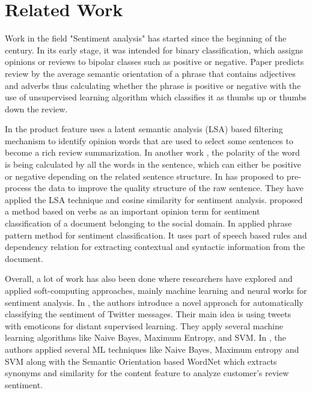 
\section{Related Work}
\label{sec: backg}

Work in the field "Sentiment analysis" has started since the beginning of the century. In its early stage, it was intended for binary classification, which assigns opinions or reviews to bipolar classes such as positive or negative. Paper \cite{turney2002thumbs} predicts review by the average semantic orientation of a phrase that contains adjectives and adverbs thus calculating whether the phrase is positive or negative with the use of unsupervised learning algorithm which classifies it as thumbs up or thumbs down the review. 
 
 In \cite{liu2011movie} the product feature uses a latent semantic analysis (LSA) based filtering mechanism to identify opinion words that are used to select some sentences to become a rich review summarization.  In another work \cite{khan2011sentiment}, the polarity of the word is being calculated by all the words in the sentence, which can either be positive or negative depending on the related sentence structure. In \cite{ramachandran2011automated} has proposed to pre-process the data to improve the quality structure of the raw sentence. They have applied the LSA technique and cosine similarity for sentiment analysis. \cite{karamibekr2012verb} proposed a method based on verbs as an important opinion term for sentiment classification of a document belonging to the social domain. In \cite{agarwal2013sentiment} applied phrase pattern method for sentiment classification. It uses part of speech based rules and dependency relation for extracting contextual and syntactic information from the document. 

Overall, a lot of work has also been done where researchers have explored and applied soft-computing approaches, mainly machine learning and neural works for sentiment analysis. In \cite{go2009twitter}, the authors introduce a novel approach for automatically classifying the sentiment of Twitter messages. Their main idea is using tweets with emoticons for distant supervised learning. They apply several machine learning algorithms like Naive Bayes, Maximum Entropy, and SVM. In \cite{gautam2014sentiment}, the authors applied several ML techniques like Naive Bayes, Maximum entropy and SVM along with the Semantic Orientation based WordNet which extracts synonyms and similarity for the content feature to analyze customer's review sentiment. 










